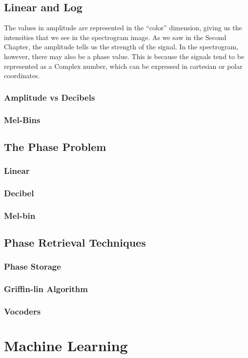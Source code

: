 \documentclass{book}
\begin{document}
\begin{appendices}
  \section{Linear and Log}
\qquad The values in amplitude are represented in the “color” dimension, giving us the intensities that we see in the spectrogram image. As we saw in the Second Chapter, the amplitude tells us the strength of the signal. In the spectrogram, however, there may also be a phase value. This is because the signals tend to be represented as a Complex number, which can be expressed in cartesian or polar coordinates.
\par
    \subsection{Amplitude vs Decibels}
    \subsection{Mel-Bins}
  \section{The Phase Problem}
    \subsection{Linear}
    \subsection{Decibel}
    \subsection{Mel-bin}
  \section{Phase Retrieval Techniques}
    \subsection{Phase Storage}
    \subsection{Griffin-lin Algorithm}
    \subsection{Vocoders}

\chapter{Machine Learning}

\end{appendices}
\end{document}

